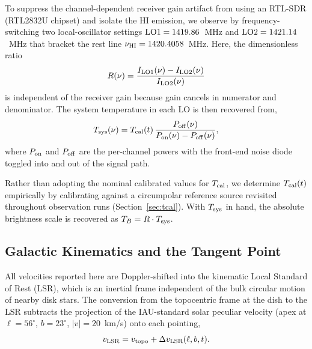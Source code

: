 \documentclass[10pt,preprint2]{aastex}
\begin{document}
To suppress the channel-dependent receiver gain artifact from using an RTL-SDR (RTL2832U chipset) and isolate the HI emission, we observe by frequency-switching two local-oscillator settings ${\rm LO1}=1419.86$~MHz and ${\rm LO2}=1421.14$~MHz that bracket the rest line $\nu_{\rm HI} = 1420.4058$~MHz. Here, the dimensionless ratio
\begin{equation}
R(\nu) = \frac{I_{\rm LO1}(\nu) - I_{\rm LO2}(\nu)}{I_{\rm LO2}(\nu)}
\label{eq:Rdef}
\end{equation}
is independent of the receiver gain because gain cancels in numerator and denominator. The system temperature in each LO is then recovered from,
\begin{equation}
T_{\rm sys}(\nu) = T_{\rm cal}(t)\,\frac{P_{\rm off}(\nu)}{P_{\rm on}(\nu) - P_{\rm off}(\nu)},
\label{eq:yfactor}
\end{equation}
where $P_{\rm on}$ and $P_{\rm off}$ are the per-channel powers with the front-end noise diode toggled into and out of the signal path. 

Rather than adopting the nominal calibrated values for $T_{\rm cal}$, we determine $T_{\rm cal}(t)$ empirically by calibrating against a circumpolar reference source revisited throughout observation runs (Section~\ref{sec:tcal}). With $T_{\rm sys}$ in hand, the absolute brightness scale is recovered as $T_B = R \cdot T_{\rm sys}$.

\subsection{Galactic Kinematics and the Tangent Point}
\label{sec:theory_kinematics}

All velocities reported here are Doppler-shifted into the kinematic Local Standard of Rest (LSR), which is an inertial frame independent of the bulk circular motion of nearby disk stars. The conversion from the topocentric frame at the dish to the LSR subtracts the projection of the IAU-standard solar peculiar velocity (apex at $\ell = 56^\circ$, $b = 23^\circ$, $|v|=20$~km/s) onto each pointing,
\begin{equation}
v_{\rm LSR} = v_{\rm topo} + \Delta v_{\rm LSR}(\ell, b, t).
\label{eq:vlsr_def}
\end{equation}
\end{document}
